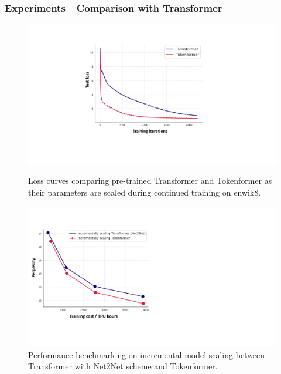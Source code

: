 \begin{frame}
\frametitle{Experiments---Comparison with Transformer}
\begin{figure}[t]
  \centering
  \begin{minipage}{0.49\textwidth}
      \centering
      \includegraphics[width=\linewidth]{./transformer-paper/zero_init_v2.pdf}
      \caption{Loss curves comparing pre-trained Transformer and Tokenformer as their parameters are scaled during continued training on enwik8.}
      \label{fig:zero_init}
  \end{minipage}%
  \hfill
  \begin{minipage}{0.49\textwidth}
      \centering
      \includegraphics[width=\linewidth]{./transformer-paper/trans_vs_token.pdf}
      \caption{Performance benchmarking on incremental model scaling between Transformer with Net2Net scheme and Tokenformer.}
      \label{fig:comparision_tf_to}
  \end{minipage}
\end{figure}
\end{frame}


